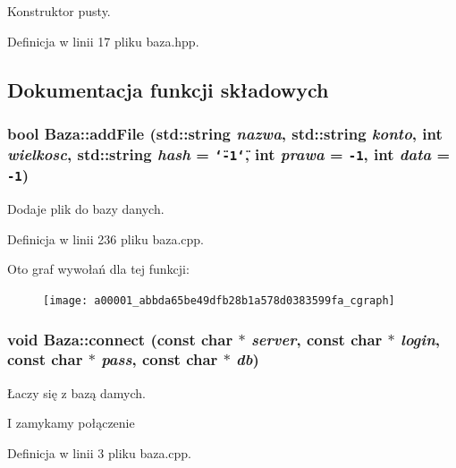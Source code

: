 Konstruktor pusty. 



Definicja w linii 17 pliku baza.hpp.

\subsection{Dokumentacja funkcji składowych}
\hypertarget{a00001_abbda65be49dfb28b1a578d0383599fa}{
\subsubsection[{addFile}]{\setlength{\rightskip}{0pt plus 5cm}bool Baza::addFile (std::string {\em nazwa}, \/  std::string {\em konto}, \/  int {\em wielkosc}, \/  std::string {\em hash} = {\tt \char`\"{}-1\char`\"{}}, \/  int {\em prawa} = {\tt -1}, \/  int {\em data} = {\tt -1})}}
\label{a00001_abbda65be49dfb28b1a578d0383599fa}


Dodaje plik do bazy danych. 



Definicja w linii 236 pliku baza.cpp.

Oto graf wywołań dla tej funkcji:\nopagebreak
\begin{figure}[H]
\begin{center}
\leavevmode
\texttt{[image: a00001\_abbda65be49dfb28b1a578d0383599fa\_cgraph]}
\end{center}
\end{figure}
\hypertarget{a00001_bef61cc396e46d347a47c75e9ef8dfde}{
\subsubsection[{connect}]{\setlength{\rightskip}{0pt plus 5cm}void Baza::connect (const char $\ast$ {\em server}, \/  const char $\ast$ {\em login}, \/  const char $\ast$ {\em pass}, \/  const char $\ast$ {\em db})}}
\label{a00001_bef61cc396e46d347a47c75e9ef8dfde}


Łaczy się z bazą damych. 



I zamykamy połączenie 

Definicja w linii 3 pliku baza.cpp.

